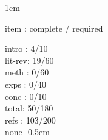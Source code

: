 \documentclass[12pt]{book}
\begin{document}
\raggedbottom
\setlength{\oddsidemargin}{53pt}
\setlength{\evensidemargin}{53pt}
\setlength{\marginparwidth}{57pt}
\setlength{\footskip}{30pt}
\openup 1em

\frontmatter
%

\tableofcontents
\listoffigures
\listoftables
\mainmatter
item : complete / required

intro : 4/10\\
lit-rev: 19/60\\
meth : 0/60\\
exps : 0/40\\
conc : 0/10\\

total: 50/180\\
refs : 103/200\\

\appendix
none
\backmatter
\openup -0.5em
%


\end{document}
